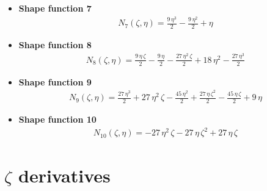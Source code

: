 \documentclass{article}
\begin{document}
\begin{itemize}
\item \textbf{Shape function 7}\newline
\begin{align}
    N_7(\zeta, \eta) = \frac{9\,\eta ^3}{2}-\frac{9\,\eta ^2}{2}+\eta 
\end{align}


\item \textbf{Shape function 8}\newline
\begin{align}
    N_8(\zeta, \eta) = \frac{9\,\eta \,\zeta}{2}-\frac{9\,\eta }{2}-\frac{27\,\eta ^2\,\zeta}{2}+18\,\eta ^2-\frac{27\,\eta ^3}{2}
\end{align}


\item \textbf{Shape function 9}\newline
\begin{align}
    N_9(\zeta, \eta) = \frac{27\,\eta ^3}{2}+27\,\eta ^2\,\zeta-\frac{45\,\eta ^2}{2}+\frac{27\,\eta \,{\zeta}^2}{2}-\frac{45\,\eta \,\zeta}{2}+9\,\eta 
\end{align}


\item \textbf{Shape function 10}\newline
\begin{align}
    N_{10}(\zeta, \eta) = -27\,\eta ^2\,\zeta-27\,\eta \,{\zeta}^2+27\,\eta \,\zeta
\end{align}

\end{itemize}



\section{$\zeta$ derivatives}
\end{document}
